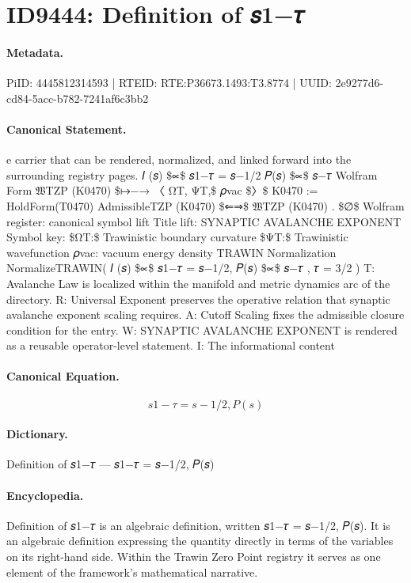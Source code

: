 \section*{ID9444: Definition of 𝑠1−𝜏}
\paragraph{Metadata.}
PiID: 4445812314593 | RTEID: RTE:P36673.1493:T3.8774 | UUID: 2e9277d6-cd84-5acc-b782-7241af6c3bb2

\paragraph{Canonical Statement.}
e carrier that can be rendered, normalized, and linked forward into the surrounding registry pages. 𝐼 (𝑠) \$∝\$ 𝑠1−𝜏 = 𝑠−1/2 𝑃(𝑠) \$∝\$ 𝑠−𝜏 Wolfram Form 𝔚TZP (K0470) \$↦−→ 〈 ΩT, ΨT,\$ 𝜌vac \$〉\$ K0470 := HoldForm(T0470) AdmissibleTZP (K0470) \$⇐⇒\$ 𝔚TZP (K0470) . \$∅\$ Wolfram register: canonical symbol lift Title lift: SYNAPTIC AVALANCHE EXPONENT Symbol key: \$ΩT:\$ Trawinistic boundary curvature \$ΨT:\$ Trawinistic wavefunction 𝜌vac: vacuum energy density TRAWIN Normalization NormalizeTRAWIN( 𝐼 (𝑠) \$∝\$ 𝑠1−𝜏 = 𝑠−1/2, 𝑃(𝑠) \$∝\$ 𝑠−𝜏 , 𝜏 = 3/2 ) T: Avalanche Law is localized within the manifold and metric dynamics arc of the directory. R: Universal Exponent preserves the operative relation that synaptic avalanche exponent scaling requires. A: Cutoff Scaling fixes the admissible closure condition for the entry. W: SYNAPTIC AVALANCHE EXPONENT is rendered as a reusable operator-level statement. I: The informational content

\paragraph{Canonical Equation.}
\[
𝑠1−𝜏 = 𝑠−1/2, 𝑃(𝑠)
\]

\paragraph{Dictionary.}
Definition of 𝑠1−𝜏 — 𝑠1−𝜏 = 𝑠−1/2, 𝑃(𝑠)

\paragraph{Encyclopedia.}
Definition of 𝑠1−𝜏 is an algebraic definition, written 𝑠1−𝜏 = 𝑠−1/2, 𝑃(𝑠). It is an algebraic definition expressing the quantity directly in terms of the variables on its right-hand side. Within the Trawin Zero Point registry it serves as one element of the framework's mathematical narrative.
